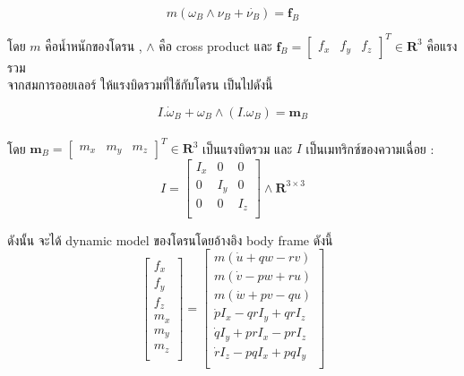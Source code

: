 \begin{equation}
	{ m(\omega_B\wedge \nu_B+\dot{\nu_B})=\mathbf{f}_B}
	\label{equ:total force}
\end{equation}

โดย $m$ คือน้ำหนักของโดรน , $\wedge$ คือ cross product และ $\mathbf{f}_B=\begin{bmatrix}f_x & f_y & f_z \end{bmatrix}^T \in \mathbf{R}^3$ 
คือแรงรวม
\\ จากสมการออยเลอร์ ให้แรงบิดรวมที่ใช้กับโดรน เป็นไปดังนี้

\begin{equation}
	{
		I.\dot{\omega}_B+\omega_B\wedge(I.\omega_B)=\mathbf{m}_B
	}
	\label{equ:total force}
\end{equation}
\\
โดย $\mathbf{m}_B=\begin{bmatrix}m_x & m_y & m_z\end{bmatrix}^T \in \mathbf{R}^3$ เป็นแรงบิดรวม และ $I$ เป็นเมทริกซ์ของความเฉื่อย :
\begin{equation}
	{
		I = \begin{bmatrix}I_x & 0 & 0 \\
		0   & I_y & 0 \\
		0   & 0 & I_z \\
		\end{bmatrix} \wedge \mathbf{R}^{3\times3}
	}
	\label{equ:inertia matrix}
\end{equation}

ดังนั้น จะได้ dynamic model ของโดรนโดยอ้างอิง body frame ดังนี้
\begin{equation}
	{
		\begin{bmatrix}	f_x \\
			f_y \\
			f_z \\
			m_x \\
			m_y \\
			m_z \\   
		\end{bmatrix} = 
		\begin{bmatrix}	m(\dot{u}+qw-rv) \\
			m(\dot{v}-pw+ru)       \\
			m(\dot{w}+pv-qu)       \\
			\dot{p}I_x-qrI_y+qrI_z \\
			\dot{q}I_y+prI_x-prI_z \\
			\dot{r}I_z-pqI_x+pqI_y \\   
		\end{bmatrix}
	}
	\label{equ:dynamic model}
\end{equation}

